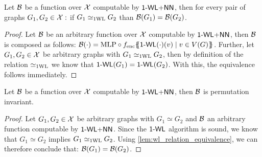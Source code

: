 \begin{lemma}\label{lem:wl_relation_equivalence}
    Let $\mathcal{B}$ be a function over $\mathcal{X}$ computable by $\textsf{1-WL+NN}$, then for every pair of graphs $G_1, G_2 \in \mathcal{X}:$ if $G_1 \simeq_{\text{1WL}} G_2$ than $\mathcal{B}(G_1) = \mathcal{B}(G_2)$.
\end{lemma}

\begin{proof}
    Let $\mathcal{B}$ be an arbitrary function over $\mathcal{X}$ computable by $\textsf{1-WL+NN}$, then $\mathcal{B}$ is composed as follows: $\mathcal{B}(\cdot) = \text{MLP} \circ f_{\text{enc}} \{\!\!\{ \textsf{1-WL}(\cdot)(v) \mid v \in V(G) \}\!\!\}$. Further, let $G_1, G_2 \in \mathcal{X}$ be arbitrary graphs with $G_1 \simeq_{\text{1WL}} G_2$, then by definition of the relation $\simeq_{\text{1WL}}$ we know that $\textsf{1-WL}(G_1) = \textsf{1-WL}(G_2)$. With this, the equivalence follows immediately.
\end{proof}

\begin{lemma}\label{lem:wlnn_permutation_invariance}
    Let $\mathcal{B}$ be a function over $\mathcal{X}$ computable by $\textsf{1-WL+NN}$, then $\mathcal{B}$ is permutation invariant.
\end{lemma}

\begin{proof}
    Let $G_1, G_2 \in \mathcal{X}$ be arbitrary graphs with $G_1 \simeq G_2$ and $\mathcal{B}$ an arbitrary function computable by $\textsf{1-WL+NN}$. Since the $\textsf{1-WL}$ algorithm is sound, we know that $G_1 \simeq G_2$ implies $G_1 \simeq_{\text{1WL}} G_2$. Using \autoref{lem:wl_relation_equivalence}, we can therefore conclude that: $\mathcal{B}(G_1) = \mathcal{B}(G_2)$.
\end{proof}

